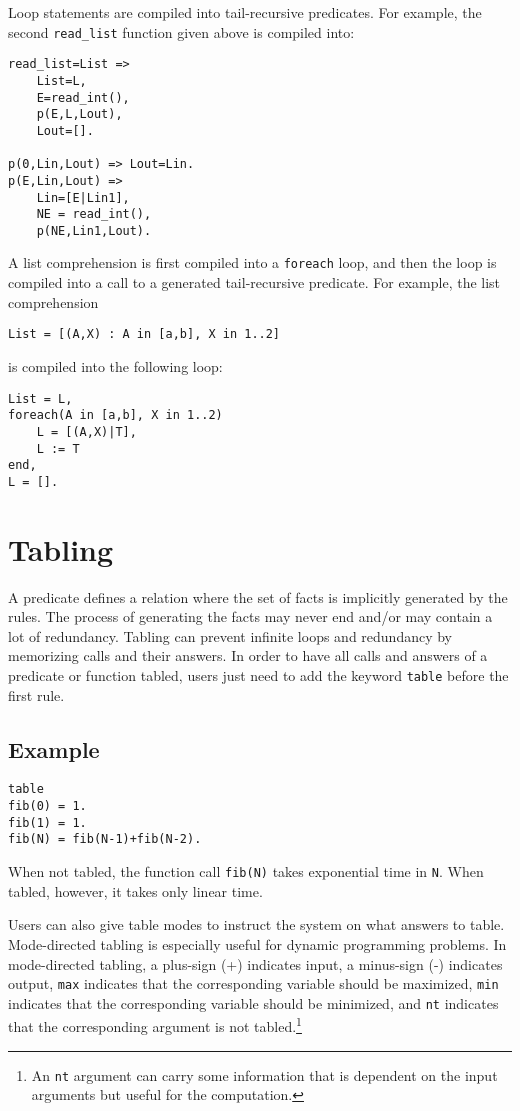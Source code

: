 Loop statements are compiled into tail-recursive predicates. For example, the second \texttt{read\_list} function given above is compiled into:
\begin{verbatim}
read_list=List =>
    List=L,
    E=read_int(),
    p(E,L,Lout),
    Lout=[].

p(0,Lin,Lout) => Lout=Lin.
p(E,Lin,Lout) => 
    Lin=[E|Lin1],
    NE = read_int(),
    p(NE,Lin1,Lout).
\end{verbatim}

A list comprehension is first compiled into a \texttt{foreach} loop, and then the loop is compiled into a call to a generated tail-recursive predicate. For example, the list comprehension 
\begin{verbatim}
List = [(A,X) : A in [a,b], X in 1..2]
\end{verbatim}
is compiled into the following loop:
\begin{verbatim}
List = L,
foreach(A in [a,b], X in 1..2)
    L = [(A,X)|T],
    L := T
end,
L = [].
\end{verbatim}

\section{Tabling}
A predicate defines a relation where the set of facts is implicitly generated by the rules. The process of generating the facts may never end and/or may contain a lot of redundancy. Tabling can prevent infinite loops and redundancy by memorizing calls and their answers. In order to have all calls and answers of a predicate or function tabled, users just need to add the keyword \texttt{table} before the first rule.

\subsection*{Example}
\begin{verbatim}
table
fib(0) = 1.
fib(1) = 1.
fib(N) = fib(N-1)+fib(N-2).
\end{verbatim}
When not tabled, the function call \texttt{fib(N)} takes exponential time in \texttt{N}. When tabled, however, it takes only linear time.

Users can also give table modes to instruct the system on what answers to table. Mode-directed tabling is especially useful for dynamic programming problems. In mode-directed tabling, a plus-sign (+) indicates input, a minus-sign (-) indicates output, \texttt{max} indicates that the corresponding variable should be maximized, \texttt{min} indicates that the corresponding variable should be minimized, and \texttt{nt} indicates that the corresponding argument is not tabled.\footnote{An {\tt nt} argument can carry some information that is dependent on the input arguments but useful for the computation.}

